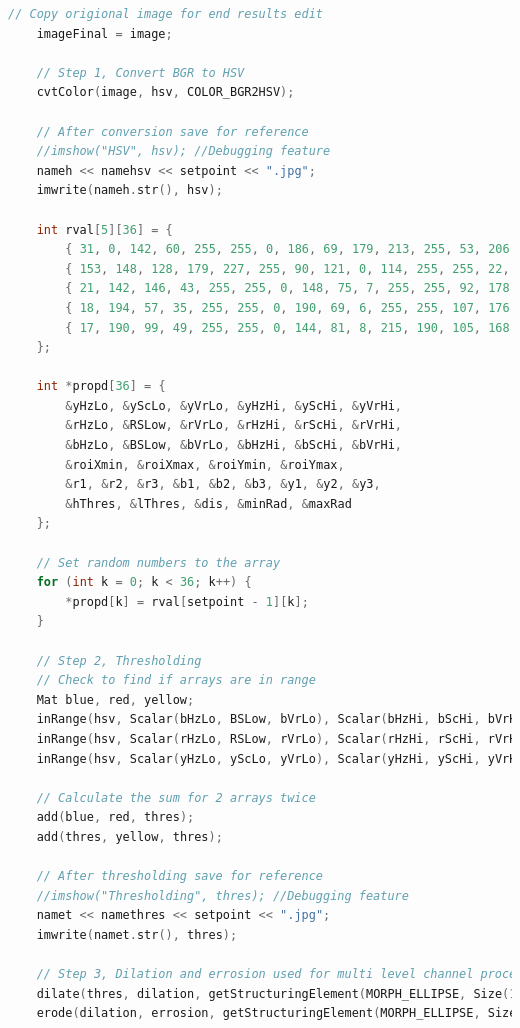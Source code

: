 \documentclass[a4paper, 10pt]{article}
\begin{document}
\begin{lstlisting}[language = C++]
	// Copy origional image for end results edit
	imageFinal = image;

	// Step 1, Convert BGR to HSV
	cvtColor(image, hsv, COLOR_BGR2HSV);

	// After conversion save for reference
	//imshow("HSV", hsv); //Debugging feature
	nameh << namehsv << setpoint << ".jpg";
	imwrite(nameh.str(), hsv);

	int rval[5][36] = {
		{ 31, 0, 142, 60, 255, 255, 0, 186, 69, 179, 213, 255, 53, 206, 51, 179, 255, 255, 300, 700, 50, 470, 100, 100, 100, 90, 50, 30, 100, 100, 100, 150, 50, 30, 10, 40 },
		{ 153, 148, 128, 179, 227, 255, 90, 121, 0, 114, 255, 255, 22, 63, 148, 89, 198, 255, 260, 700, 170, 470, 110, 100, 100, 100, 130, 50, 140, 180, 110, 150, 50, 30, 10, 40 },
		{ 21, 142, 146, 43, 255, 255, 0, 148, 75, 7, 255, 255, 92, 178, 8, 150, 255, 225, 260, 700, 50, 470, 50, 40, 70, 20, 30,20, 10, 160, 160, 126, 42, 30, 5, 40 },
		{ 18, 194, 57, 35, 255, 255, 0, 190, 69, 6, 255, 255, 107, 176, 45, 112, 255, 255, 260, 700, 50, 470, 60, 65, 67, 34, 85, 88, 100, 100, 100, 82, 34, 30, 10, 40 },
		{ 17, 190, 99, 49, 255, 255, 0, 144, 81, 8, 215, 190, 105, 168, 24, 157, 255, 204, 260, 600, 170, 470, 100, 100, 100, 66, 70, 61, 100, 100, 100, 100, 33, 30, 10, 40 }
	};

	int *propd[36] = {
		&yHzLo, &yScLo, &yVrLo, &yHzHi, &yScHi, &yVrHi,
		&rHzLo, &RSLow, &rVrLo, &rHzHi, &rScHi, &rVrHi,
		&bHzLo, &BSLow, &bVrLo, &bHzHi, &bScHi, &bVrHi,
		&roiXmin, &roiXmax, &roiYmin, &roiYmax,
		&r1, &r2, &r3, &b1, &b2, &b3, &y1, &y2, &y3,
		&hThres, &lThres, &dis, &minRad, &maxRad
	};

	// Set random numbers to the array
	for (int k = 0; k < 36; k++) {
		*propd[k] = rval[setpoint - 1][k];
	}

	// Step 2, Thresholding 
	// Check to find if arrays are in range
	Mat blue, red, yellow;
	inRange(hsv, Scalar(bHzLo, BSLow, bVrLo), Scalar(bHzHi, bScHi, bVrHi), blue);
	inRange(hsv, Scalar(rHzLo, RSLow, rVrLo), Scalar(rHzHi, rScHi, rVrHi), red);
	inRange(hsv, Scalar(yHzLo, yScLo, yVrLo), Scalar(yHzHi, yScHi, yVrHi), yellow);
	
	// Calculate the sum for 2 arrays twice 
	add(blue, red, thres);
	add(thres, yellow, thres);

	// After thresholding save for reference
	//imshow("Thresholding", thres); //Debugging feature
	namet << namethres << setpoint << ".jpg";
	imwrite(namet.str(), thres);

	// Step 3, Dilation and errosion used for multi level channel processing 
	dilate(thres, dilation, getStructuringElement(MORPH_ELLIPSE, Size(11, 11)));
	erode(dilation, errosion, getStructuringElement(MORPH_ELLIPSE, Size(3, 3)));


\end{lstlisting}
\end{document}
